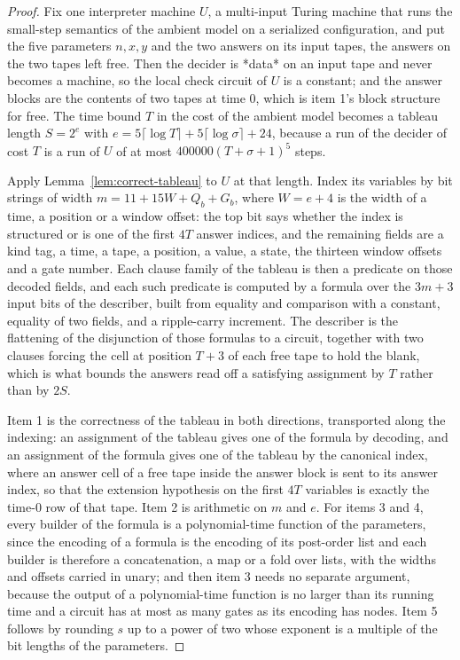 \begin{proof}
\leanok
{}
Fix one interpreter machine $U$, a multi-input Turing machine that runs the small-step
semantics of the ambient model on a serialized configuration, and put the five parameters
$n, x, y$ and the two answers on its input tapes, the answers on the two tapes left free.
Then the decider is *data* on an input tape and never becomes a machine, so the local check
circuit of $U$ is a constant; and the answer blocks are the contents of two tapes at time
$0$, which is item 1's block structure for free. The time bound $T$ in the cost of the
ambient model becomes a tableau length $S = 2^e$ with $e = 5\lceil \log T \rceil +
5 \lceil \log \sigma \rceil + 24$, because a run of the decider of cost $T$ is a run of
$U$ of at most $400000 (T + \sigma + 1)^5$ steps.

Apply Lemma~\ref{lem:correct-tableau} to $U$ at that length. Index its variables by bit
strings of width $m = 11 + 15 W + Q_b + G_b$, where $W = e + 4$ is the width of a time, a
position or a window offset: the top bit says whether the index is structured or is one of
the first $4T$ answer indices, and the remaining fields are a kind tag, a time, a tape, a
position, a value, a state, the thirteen window offsets and a gate number. Each clause
family of the tableau is then a predicate on those decoded fields, and each such predicate
is computed by a formula over the $3m + 3$ input bits of the describer, built from equality
and comparison with a constant, equality of two fields, and a ripple-carry increment. The
describer is the flattening of the disjunction of those formulas to a circuit, together with
two clauses forcing the cell at position $T + 3$ of each free tape to hold the blank, which
is what bounds the answers read off a satisfying assignment by $T$ rather than by $2S$.

Item 1 is the correctness of the tableau in both directions, transported along the indexing:
an assignment of the tableau gives one of the formula by decoding, and an assignment of the
formula gives one of the tableau by the canonical index, where an answer cell of a free tape
inside the answer block is sent to its answer index, so that the extension hypothesis on the
first $4T$ variables is exactly the time-$0$ row of that tape. Item 2 is arithmetic on $m$
and $e$. For items 3 and 4, every builder of the formula is a polynomial-time function of the
parameters, since the encoding of a formula is the encoding of its post-order list and each
builder is therefore a concatenation, a map or a fold over lists, with the widths and offsets
carried in unary; and then item 3 needs no separate argument, because the output of a
polynomial-time function is no larger than its running time and a circuit has at most as
many gates as its encoding has nodes. Item 5 follows by rounding $s$ up to a power of two
whose exponent is a multiple of the bit lengths of the parameters.
\end{proof}

